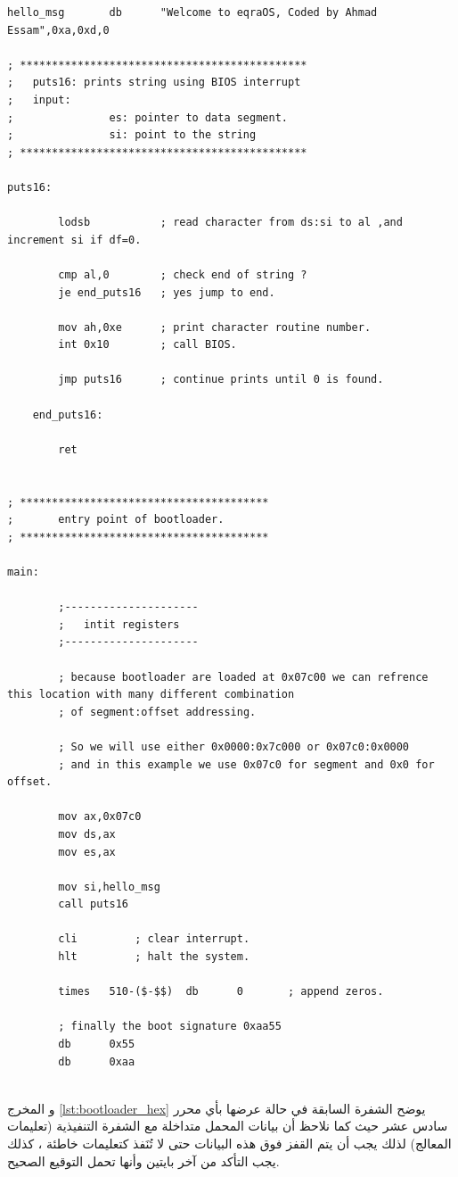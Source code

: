 \documentclass[document.tex]{subfiles}
\begin{document}
\begin{english}
\begin{lstlisting}[label=lst:bpb_bootloader,caption=\en{BPB example}]
hello_msg		db		"Welcome to eqraOS, Coded by Ahmad Essam",0xa,0xd,0

; *********************************************
;	puts16: prints string using BIOS interrupt
;   input:
;				es: pointer to data segment.
;				si: point to the string
; *********************************************

puts16:
		
		lodsb			; read character from ds:si to al ,and increment si if df=0.
		
		cmp al,0		; check end of string ?
		je end_puts16	; yes jump to end.
		
		mov ah,0xe		; print character routine number.
		int 0x10		; call BIOS.
		
		jmp puts16		; continue prints until 0 is found.
		
	end_puts16:
	
		ret				
		
		
; ***************************************
;		entry point of bootloader.
; ***************************************
		
main:				

		;---------------------
		;	intit registers
		;---------------------
		
		; because bootloader are loaded at 0x07c00 we can refrence this location with many different combination
		; of segment:offset addressing.
		
		; So we will use either 0x0000:0x7c000 or 0x07c0:0x0000
		; and in this example we use 0x07c0 for segment and 0x0 for offset.
		
		mov ax,0x07c0			
		mov ds,ax
		mov es,ax
		
		mov si,hello_msg
		call puts16

		cli			; clear interrupt.		
		hlt			; halt the system.
		
		times	510-($-$$)	db		0		; append zeros.
		
		; finally the boot signature 0xaa55
		db		0x55
		db		0xaa
		

\end{lstlisting}
\end{english}


و المخرج \ref{lst:bootloader_hex} يوضح الشفرة السابقة في حالة عرضها بأي محرر سادس عشر  حيث كما نلاحظ أن بيانات المحمل متداخلة مع الشفرة التنفيذية (تعليمات المعالج) لذلك يجب أن يتم القفز فوق هذه البيانات حتى لا تُنَفذ كتعليمات خاطئة ، كذلك يجب التأكد من آخر بايتين وأنها تحمل التوقيع الصحيح.
\end{document}

